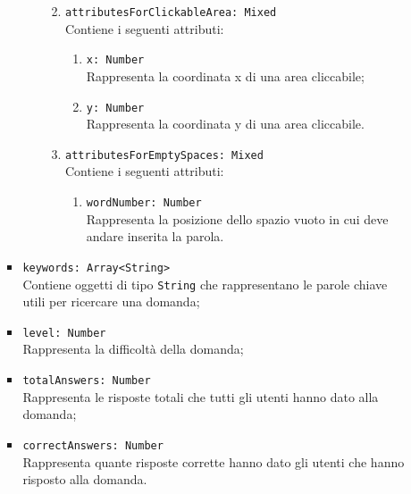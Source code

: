 \begin{itemize}
\begin{itemize}
\begin{itemize}
\begin{itemize}
\begin{enumerate}
\begin{enumerate}
						\end{enumerate}  
							\item \texttt{attributesForClickableArea: Mixed}\\ Contiene i seguenti attributi:
        					\begin{enumerate}
        						\item \texttt{x: Number}\\ Rappresenta la coordinata x di una area cliccabile;
        						\item \texttt{y: Number}\\ Rappresenta la coordinata y di una area cliccabile.  
						\end{enumerate}    
							\item \texttt{attributesForEmptySpaces: Mixed}\\ Contiene i seguenti attributi:
        					\begin{enumerate}
        						\item \texttt{wordNumber: Number}\\ Rappresenta la posizione dello spazio vuoto in cui deve andare inserita la parola.  
						\end{enumerate}        						  						
					\end{enumerate}
				\end{itemize}			
					\item \texttt{keywords: Array<String>}\\ Contiene oggetti di tipo \texttt{String} che rappresentano le parole chiave utili per ricercare una domanda;	 
			\item \texttt{level: Number}\\ Rappresenta la difficoltà della domanda;
			\item \texttt{totalAnswers: Number}\\ Rappresenta le risposte totali che tutti gli utenti hanno dato alla domanda;
			\item \texttt{correctAnswers: Number}\\ Rappresenta quante risposte corrette hanno dato gli utenti che hanno risposto alla domanda.
		

\end{itemize}
\end{itemize}
\end{itemize}
